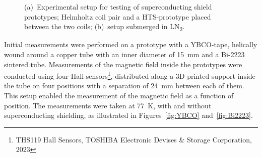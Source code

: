 \begin{refsection}
        \begin{figure}
            \centering
            \hfill
            \caption{(a)~Experimental setup for testing of superconducting shield prototypes; Helmholtz coil pair and a HTS-prototype placed between the two coils; (b)~setup submerged in LN\textsubscript{2}.}
        \label{fig:Setup}
        \end{figure}

        Initial measurements were performed on a prototype with a YBCO-tape, helically wound around a copper tube with an inner diameter of \SI{15}{mm} and a Bi-2223 sintered tube. 
        Measurements of the magnetic field inside the prototypes were conducted using four Hall sensors\footnote{THS119 Hall Sensors, TOSHIBA Electronic Devises \& Storage Corporation, 2023}, distributed along a 3D-printed support inside the tube on four positions with a separation of \SI{24}{mm} between each of them. 
        This setup enabled the measurement of the magnetic field as a function of position. 
        The measurements were taken at \SI{77}{K}, with and without superconducting shielding, as illustrated in Figures~\ref{fig:YBCO} and~\ref{fig:Bi2223}.


\end{refsection}
